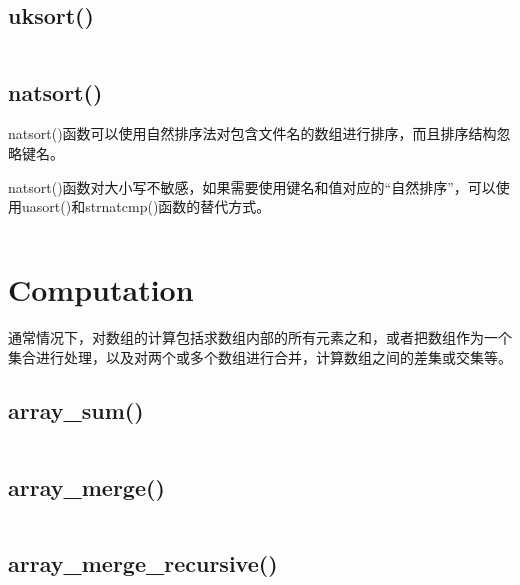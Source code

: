 \subsection{uksort()}



\begin{lstlisting}[language=PHP]

\end{lstlisting}

\subsection{natsort()}


natsort()函数可以使用自然排序法对包含文件名的数组进行排序，而且排序结构忽略键名。

natsort()函数对大小写不敏感，如果需要使用键名和值对应的“自然排序”，可以使用uasort()和strnatcmp()函数的替代方式。



\begin{lstlisting}[language=PHP]

\end{lstlisting}


\section{Computation}


通常情况下，对数组的计算包括求数组内部的所有元素之和，或者把数组作为一个集合进行处理，以及对两个或多个数组进行合并，计算数组之间的差集或交集等。

\subsection{array\_sum()}

\begin{lstlisting}[language=PHP]

\end{lstlisting}

\subsection{array\_merge()}



\begin{lstlisting}[language=PHP]

\end{lstlisting}

\subsection{array\_merge\_recursive()}


